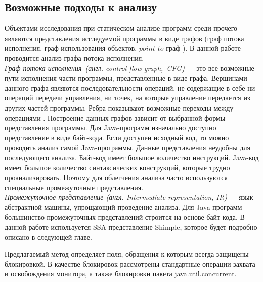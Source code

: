 \subsection{Возможные подходы к анализу}
Объектами исследования при статическом анализе программ среди прочего являются представления исследуемой программы в виде графов (граф потока исполнения, граф использования объектов, $point$-$to$ граф \cite{Whaley:1999:CPE:320385.320400}). 
В данной работе проводится анализ графа потока исполнения. 
\\\emph{Граф потока исполнения\ (англ. control flow graph,\ CFG)} --- это все возможные пути исполнения части программы, представленные в виде графа. Вершинами данного графа являются последовательности операций, не содержащие в себе ни операций передачи управления, ни точек, на которые управление передается из других частей программы. Ребра показывают возможные переходы между операциями \cite{CFA}.
Построение данных графов зависит от выбранной формы представления программы. Для Java-программ изначально 
доступно представление в виде байт-кода. Если доступен исходный код, то можно проводить анализ самой Java-программы.
Данные представления неудобны для последующего анализа. Байт-код имеет большое количество инструкций. Java-код имеет большое количество синтаксических конструкций, которые трудно проанализировать. Поэтому для облегчения анализа часто используются специальные промежуточные представления.
\\\emph{Промежуточное представление (англ. Intermediate representation, IR)} --- язык абстрактной машины, упрощающий проведение анализа. Для Java-программ большинство промежуточных представлений строится на основе байт-кода. В данной работе используется SSA представление Shimple, которое будет подробно описано в следующей главе.

Предлагаемый метод определяет поля, обращения к которым всегда защищены блокировкой. В качестве блокировок рассмотрены стандартные операции захвата и освобождения монитора, а также блокировки пакета java.util.concurrent.
\FloatBarrier

